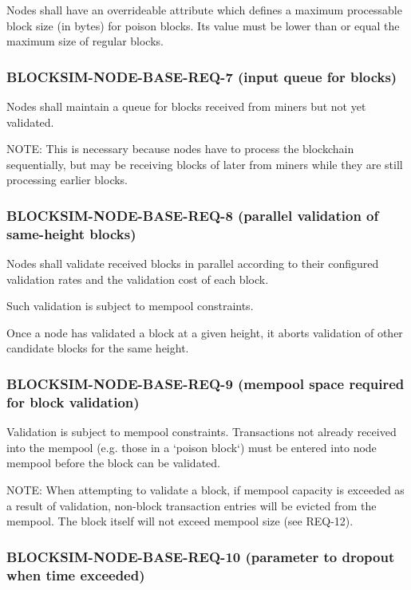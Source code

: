 \documentclass{scrreprt}
\begin{document}
        Nodes shall have an overrideable attribute which defines a maximum
        processable block size (in bytes) for poison blocks.
        Its value must be lower than or equal the maximum size of regular blocks.

      \subsubsection{BLOCKSIM-NODE-BASE-REQ-7 (input queue for blocks)}

        Nodes shall maintain a queue for blocks received from miners but not
        yet validated.

        NOTE: This is necessary because nodes have to process the blockchain
        sequentially, but may be receiving blocks of later from miners while
        they are still processing earlier blocks.

      \subsubsection{BLOCKSIM-NODE-BASE-REQ-8 (parallel validation of same-height blocks)}

        Nodes shall validate received blocks in parallel according to their
        configured validation rates and the validation cost of each block.

        Such validation is subject to mempool constraints.

        Once a node has validated a block at a given height, it aborts
        validation of other candidate blocks for the same height.

      \subsubsection{BLOCKSIM-NODE-BASE-REQ-9 (mempool space required for block validation)}

        Validation is subject to mempool constraints.
        Transactions not already received into the mempool (e.g. those in a
        `poison block`) must be entered into node mempool before the block
        can be validated.

        NOTE: When attempting to validate a block, if mempool capacity is
        exceeded as a result of validation, non-block transaction entries
        will be evicted from the mempool.  The block itself will not
        exceed mempool size (see REQ-12).

      \subsubsection{BLOCKSIM-NODE-BASE-REQ-10 (parameter to dropout when time exceeded)}
\end{document}
